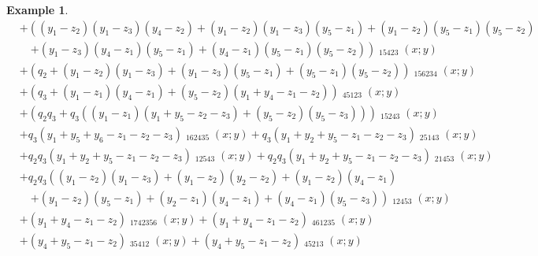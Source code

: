 \documentclass{amsart}
\theoremstyle{definition}
\newtheorem{example}[lemma]{Example}
\theoremstyle{remark}
\numberwithin{equation}{section}
\DeclareMathOperator{\qsch}{\widetilde{\mathfrak{S}}}
\begin{document}
\begin{example}
\begin{align*}
&+ \left(\left(y_{1} - z_{2}\right) \left(y_{1} - z_{3}\right) \left(y_{4} - z_{2}\right) + \left(y_{1} - z_{2}\right) \left(y_{1} - z_{3}\right) \left(y_{5} - z_{1}\right) + \left(y_{1} - z_{2}\right) \left(y_{5} - z_{1}\right) \left(y_{5} - z_{2}\right) \right. \\
&\quad \left. + \left(y_{1} - z_{3}\right) \left(y_{4} - z_{1}\right) \left(y_{5} - z_{1}\right) + \left(y_{4} - z_{1}\right) \left(y_{5} - z_{1}\right) \left(y_{5} - z_{2}\right)\right) \qsch_{15423}{\left(x; y \right)} \\
&+ \left(q_{2} + \left(y_{1} - z_{2}\right) \left(y_{1} - z_{3}\right) + \left(y_{1} - z_{3}\right) \left(y_{5} - z_{1}\right) + \left(y_{5} - z_{1}\right) \left(y_{5} - z_{2}\right)\right) \qsch_{156234}{\left(x; y \right)} \\
&+ \left(q_{3} + \left(y_{1} - z_{1}\right) \left(y_{4} - z_{1}\right) + \left(y_{5} - z_{2}\right) \left(y_{1} + y_{4} - z_{1} - z_{2}\right)\right) \qsch_{45123}{\left(x; y \right)} \\
&+ \left(q_{2} q_{3} + q_{3} \left(\left(y_{1} - z_{1}\right) \left(y_{1} + y_{5} - z_{2} - z_{3}\right) + \left(y_{5} - z_{2}\right) \left(y_{5} - z_{3}\right)\right)\right) \qsch_{15243}{\left(x; y \right)} \\
&+ q_{3} \left(y_{1} + y_{5} + y_{6} - z_{1} - z_{2} - z_{3}\right) \qsch_{162435}{\left(x; y \right)} + q_{3} \left(y_{1} + y_{2} + y_{5} - z_{1} - z_{2} - z_{3}\right) \qsch_{25143}{\left(x; y \right)} \\
&+ q_{2} q_{3} \left(y_{1} + y_{2} + y_{5} - z_{1} - z_{2} - z_{3}\right) \qsch_{12543}{\left(x; y \right)} + q_{2} q_{3} \left(y_{1} + y_{2} + y_{5} - z_{1} - z_{2} - z_{3}\right) \qsch_{21453}{\left(x; y \right)} \\
&+ q_{2} q_{3} \left((y_{1} - z_{2}) (y_{1} - z_{3}) + (y_{1} - z_{2}) (y_{2} - z_{2}) + (y_{1} - z_{2}) (y_{4} - z_{1}) \right. \\
&\quad \left. + (y_{1} - z_{2}) (y_{5} - z_{1}) + (y_{2} - z_{1}) (y_{4} - z_{1}) + (y_{4} - z_{1}) (y_{5} - z_{3})\right) \qsch_{12453}{\left(x; y \right)} \\
&+ \left(y_{1} + y_{4} - z_{1} - z_{2}\right) \qsch_{1742356}{\left(x; y \right)} + \left(y_{1} + y_{4} - z_{1} - z_{2}\right) \qsch_{461235}{\left(x; y \right)} \\
&+ \left(y_{4} + y_{5} - z_{1} - z_{2}\right) \qsch_{35412}{\left(x; y \right)} + \left(y_{4} + y_{5} - z_{1} - z_{2}\right) \qsch_{45213}{\left(x; y \right)} \\

\end{align*}
\end{example}
\end{document}

